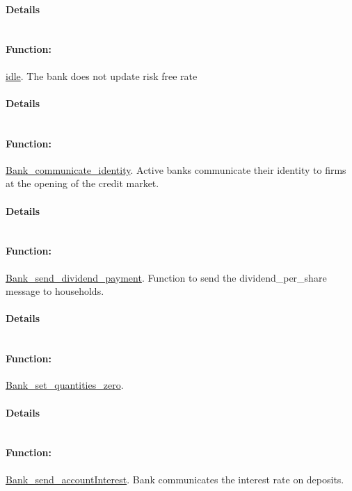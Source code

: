 \documentclass[a4paper,11pt]{article}
\begin{document}
\paragraph{Details}
\begin{verbatim}
\end{verbatim}
\paragraph{Function:}\url{idle}.
The bank does not update risk free rate
\paragraph{Details}
\begin{verbatim}
\end{verbatim}
\paragraph{Function:}\url{Bank_communicate_identity}.
Active banks communicate their identity to firms at the opening of the credit market.
\paragraph{Details}
\begin{verbatim}
\end{verbatim}
\paragraph{Function:}\url{Bank_send_dividend_payment}.
Function to send the dividend\_per\_share message to households.
\paragraph{Details}
\begin{verbatim}
\end{verbatim}
\paragraph{Function:}\url{Bank_set_quantities_zero}.

\paragraph{Details}
\begin{verbatim}
\end{verbatim}
\paragraph{Function:}\url{Bank_send_accountInterest}.
Bank communicates the interest rate on deposits.
\end{document}
